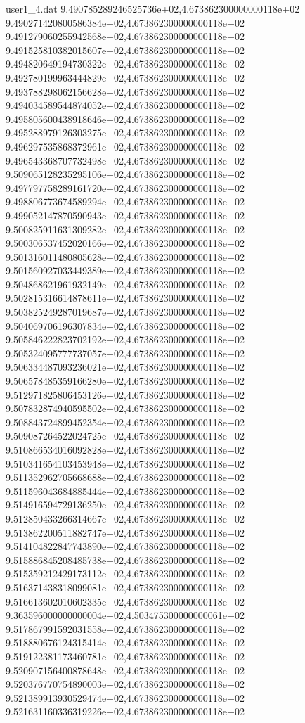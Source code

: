 \begin{filecontents}{user1_4.dat}
9.490785289246525736e+02,4.673862300000000118e+02
9.490271420800586384e+02,4.673862300000000118e+02
9.491279060255942568e+02,4.673862300000000118e+02
9.491525810382015607e+02,4.673862300000000118e+02
9.494820649194730322e+02,4.673862300000000118e+02
9.492780199963444829e+02,4.673862300000000118e+02
9.493788298062156628e+02,4.673862300000000118e+02
9.494034589544874052e+02,4.673862300000000118e+02
9.495805600438918646e+02,4.673862300000000118e+02
9.495288979126303275e+02,4.673862300000000118e+02
9.496297535868372961e+02,4.673862300000000118e+02
9.496543368707732498e+02,4.673862300000000118e+02
9.509065128235295106e+02,4.673862300000000118e+02
9.497797758289161720e+02,4.673862300000000118e+02
9.498806773674589294e+02,4.673862300000000118e+02
9.499052147870590943e+02,4.673862300000000118e+02
9.500825911631309282e+02,4.673862300000000118e+02
9.500306537452020166e+02,4.673862300000000118e+02
9.501316011480805628e+02,4.673862300000000118e+02
9.501560927033449389e+02,4.673862300000000118e+02
9.504868621961932149e+02,4.673862300000000118e+02
9.502815316614878611e+02,4.673862300000000118e+02
9.503825249287019687e+02,4.673862300000000118e+02
9.504069706196307834e+02,4.673862300000000118e+02
9.505846222823702192e+02,4.673862300000000118e+02
9.505324095777737057e+02,4.673862300000000118e+02
9.506334487093236021e+02,4.673862300000000118e+02
9.506578485359166280e+02,4.673862300000000118e+02
9.512971825806453126e+02,4.673862300000000118e+02
9.507832874940595502e+02,4.673862300000000118e+02
9.508843724899452354e+02,4.673862300000000118e+02
9.509087264522024725e+02,4.673862300000000118e+02
9.510866534016092828e+02,4.673862300000000118e+02
9.510341654103453948e+02,4.673862300000000118e+02
9.511352962705668688e+02,4.673862300000000118e+02
9.511596043684885444e+02,4.673862300000000118e+02
9.514916594729136250e+02,4.673862300000000118e+02
9.512850433266314667e+02,4.673862300000000118e+02
9.513862200511882747e+02,4.673862300000000118e+02
9.514104822847743890e+02,4.673862300000000118e+02
9.515886845208485738e+02,4.673862300000000118e+02
9.515359212429173112e+02,4.673862300000000118e+02
9.516371438318099081e+02,4.673862300000000118e+02
9.516613602010602335e+02,4.673862300000000118e+02
9.363596000000000004e+02,4.503475300000000061e+02
9.517867991592031558e+02,4.673862300000000118e+02
9.518880676124315414e+02,4.673862300000000118e+02
9.519122381173460781e+02,4.673862300000000118e+02
9.520907156400878648e+02,4.673862300000000118e+02
9.520376770754890003e+02,4.673862300000000118e+02
9.521389913930529474e+02,4.673862300000000118e+02
9.521631160336319226e+02,4.673862300000000118e+02

\end{filecontents}
